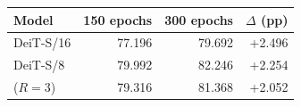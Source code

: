 \begin{tabular}{lrrr}
\toprule
Model & 150 epochs & 300 epochs & $\Delta$ (pp) \\
\midrule
DeiT-S/16 & 77.196 & 79.692 & +2.496 \\
DeiT-S/8 & 79.992 & 82.246 & +2.254 \\
\mn{} ($R=3$) & 79.316 & 81.368 & +2.052 \\
\bottomrule
\end{tabular}

